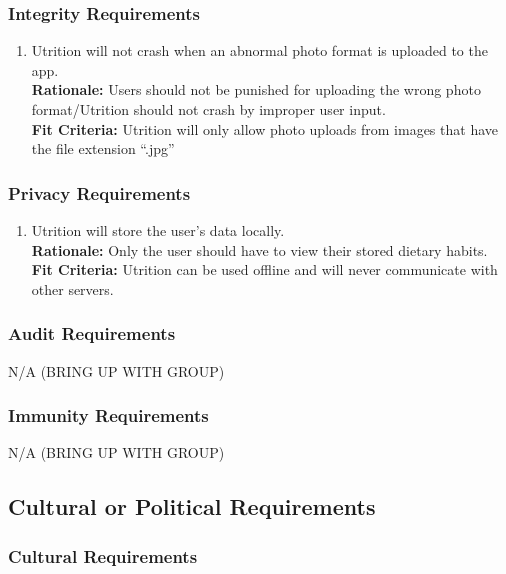 \documentclass[12pt]{article}
\begin{document}
\subsubsection{Integrity Requirements}
\begin{enumerate}[{SR}2. ] 
	\item Utrition will not crash when an abnormal photo format is uploaded to the app. \\
	\textbf{Rationale:} Users should not be punished for uploading the wrong photo format/Utrition should not crash by improper user input.\\	
	\textbf{Fit Criteria:}  Utrition will only allow photo uploads from images that have the file extension “.jpg”
\end{enumerate}

\subsubsection{Privacy Requirements}
\begin{enumerate}[{SR}3. ] 
	\item Utrition will store the user’s data locally.\\
	\textbf{Rationale:} Only the user should have to view their stored dietary habits. \\	
	\textbf{Fit Criteria:} Utrition can be used offline and will never communicate with other servers.
\end{enumerate}

\subsubsection{Audit Requirements}
\hspace{1.5cm}N/A (BRING UP WITH GROUP) 

\subsubsection{Immunity Requirements}
\hspace{1.5cm}N/A (BRING UP WITH GROUP) 

\subsection{Cultural or Political Requirements}

\subsubsection{Cultural Requirements}
\end{document}
